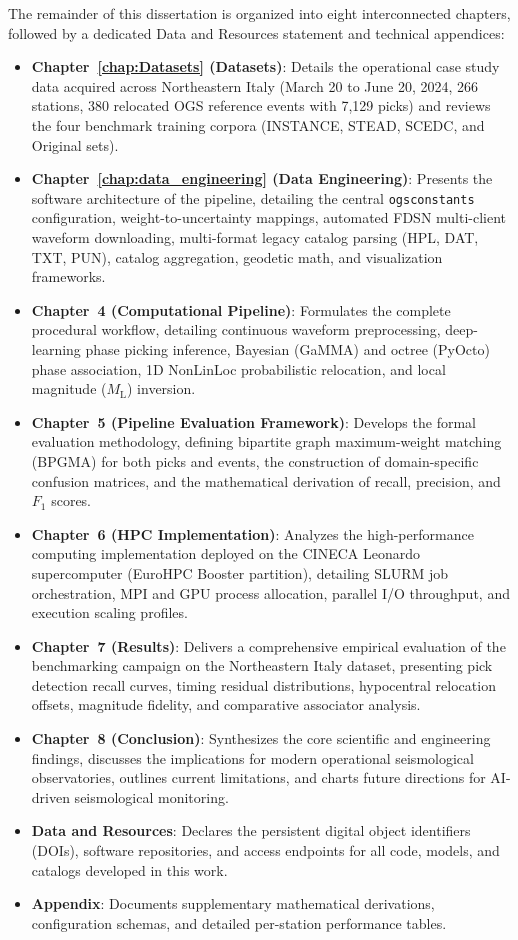 The remainder of this dissertation is organized into eight interconnected chapters, followed by a dedicated Data and Resources statement and technical appendices:
\begin{itemize}
  \item \textbf{Chapter~\ref{chap:Datasets} (Datasets)}: Details the operational case study data acquired across Northeastern Italy (March 20 to June 20, 2024, 266 stations, 380 relocated OGS reference events with 7,129 picks) and reviews the four benchmark training corpora (INSTANCE, STEAD, SCEDC, and Original sets).
  \item \textbf{Chapter~\ref{chap:data_engineering} (Data Engineering)}: Presents the software architecture of the pipeline, detailing the central \texttt{ogsconstants} configuration, weight-to-uncertainty mappings, automated FDSN multi-client waveform downloading, multi-format legacy catalog parsing (HPL, DAT, TXT, PUN), catalog aggregation, geodetic math, and visualization frameworks.
  \item \textbf{Chapter~4 (Computational Pipeline)}: Formulates the complete procedural workflow, detailing continuous waveform preprocessing, deep-learning phase picking inference, Bayesian (\ac{GaMMA}) and octree (\ac{PyOcto}) phase association, 1D \ac{NonLinLoc} probabilistic relocation, and local magnitude ($M_{\mathrm{L}}$) inversion.
  \item \textbf{Chapter~5 (Pipeline Evaluation Framework)}: Develops the formal evaluation methodology, defining bipartite graph maximum-weight matching (\ac{BPGMA}) for both picks and events, the construction of domain-specific confusion matrices, and the mathematical derivation of recall, precision, and $F_1$ scores.
  \item \textbf{Chapter~6 (HPC Implementation)}: Analyzes the high-performance computing implementation deployed on the CINECA Leonardo supercomputer (EuroHPC Booster partition), detailing SLURM job orchestration, MPI and GPU process allocation, parallel I/O throughput, and execution scaling profiles.
  \item \textbf{Chapter~7 (Results)}: Delivers a comprehensive empirical evaluation of the benchmarking campaign on the Northeastern Italy dataset, presenting pick detection recall curves, timing residual distributions, hypocentral relocation offsets, magnitude fidelity, and comparative associator analysis.
  \item \textbf{Chapter~8 (Conclusion)}: Synthesizes the core scientific and engineering findings, discusses the implications for modern operational seismological observatories, outlines current limitations, and charts future directions for AI-driven seismological monitoring.
  \item \textbf{Data and Resources}: Declares the persistent digital object identifiers (DOIs), software repositories, and access endpoints for all code, models, and catalogs developed in this work.
  \item \textbf{Appendix}: Documents supplementary mathematical derivations, configuration schemas, and detailed per-station performance tables.
\end{itemize}
